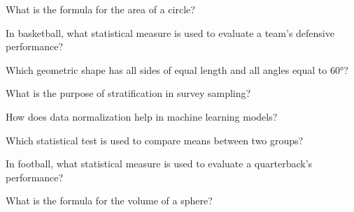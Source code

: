 \begin{enhancedmcq}{What is the formula for the area of a circle?}
\end{enhancedmcq}

\begin{enhancedmcq}{In basketball, what statistical measure is used to evaluate a team's defensive performance?}
\end{enhancedmcq}

\begin{enhancedmcq}{Which geometric shape has all sides of equal length and all angles equal to 60°?}
\end{enhancedmcq}

\begin{enhancedmcq}{What is the purpose of stratification in survey sampling?}
\end{enhancedmcq}

\begin{enhancedmcq}{How does data normalization help in machine learning models?}
\end{enhancedmcq}

\begin{enhancedmcq}{Which statistical test is used to compare means between two groups?}
\end{enhancedmcq}

\begin{enhancedmcq}{In football, what statistical measure is used to evaluate a quarterback's performance?}
\end{enhancedmcq}

\begin{enhancedmcq}{What is the formula for the volume of a sphere?}
\end{enhancedmcq}

